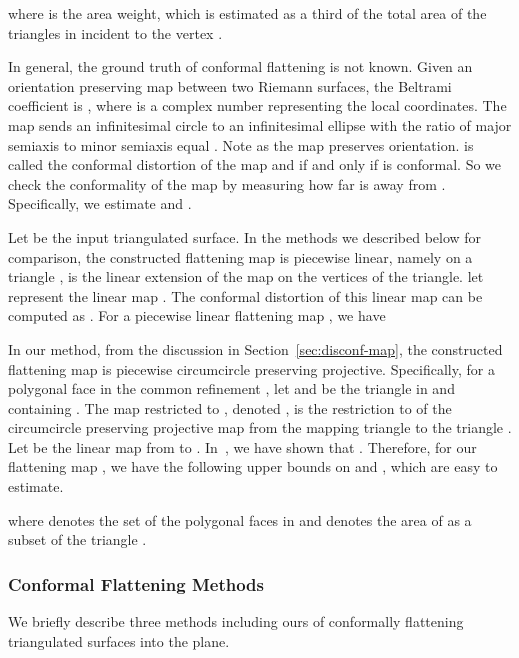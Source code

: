 \documentclass[11pt]{article}
\begin{document}
where  is the area weight, which is estimated as a third of the total area of 
the triangles in  incident to the vertex . 

In general, the ground truth of conformal flattening is not known. Given an orientation 
preserving map  between two Riemann surfaces, the Beltrami coefficient is
, where  is a complex number representing the local coordinates. 
The map  sends an infinitesimal circle to an 
infinitesimal ellipse with the ratio of major semiaxis to minor semiaxis equal
. Note  as the map  preserves orientation. 
 is called the conformal distortion of the map  and  if and only if  
is conformal. So we check the conformality of the map 
by measuring how far  is away from . Specifically, we estimate  and 
.

Let  be the input triangulated surface.
In the methods we described below for comparison, 
the constructed flattening map  is piecewise linear, namely on a triangle , 
 is the linear extension of the map on the vertices of the triangle. 
let  represent the linear map . The conformal distortion 
of this linear map  can be computed as  . 
For a piecewise linear flattening map , we have

In our method, from the discussion in Section~\ref{sec:disconf-map}, the constructed flattening map  
is piecewise circumcircle preserving projective. Specifically, for a polygonal face  in
the common refinement , let  and  be the triangle in  and  containing . 
The map  restricted to , denoted , is the restriction to  of the circumcircle preserving 
projective map from the mapping triangle  to the triangle .
Let  be the linear map from  to . In~\cite{glsw2}, we have shown
that . Therefore, for our flattening map , we have the 
following upper bounds on  and , which are easy to estimate. 

where  denotes the set of the polygonal faces in  and  denotes
the area of  as a subset of the triangle . 

\subsubsection{Conformal Flattening Methods}
We briefly describe three methods including ours of conformally flattening triangulated surfaces into the plane.
\end{document}
